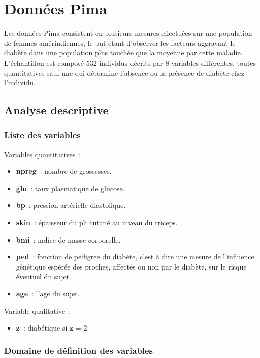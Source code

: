 \documentclass[a4paper,10pt]{report}
\begin{document}
\section{Données Pima}
\label{section:pima-descriptif}

Les données Pima consistent en plusieurs mesures effectuées sur une population de femmes amérindiennes, le but étant d'observer les facteurs aggravant le diabète dans une population plus touchée que la moyenne par cette maladie.
L'échantillon est composé 532 individus décrits par 8 variables différentes, toutes quantitatives sauf une qui détermine l'absence ou la présence de diabète chez l'individu.

\subsection{Analyse descriptive}

\subsubsection{Liste des variables}

Variables quantitatives~:
\begin{itemize}
	\item \textbf{npreg}~: nombre de grossesses.
	\item \textbf{glu}~: taux plasmatique de glucose.
	\item \textbf{bp}~: pression artérielle diastolique.
	\item \textbf{skin}~: épaisseur du pli cutané au niveau du triceps.
	\item \textbf{bmi}~: indice de masse corporelle.
	\item \textbf{ped}~: fonction de pedigree du diabète, c'est à dire une mesure de l’influence génétique espérée des proches, affectés ou non par le diabète, sur le risque éventuel du sujet.
	\item \textbf{age}~: l'age du sujet.
\end{itemize}
Variable qualitative~:
\begin{itemize}
	\item \textbf{z}~: diabétique si \textbf{z} = 2.
\end{itemize}

\subsubsection{Domaine de définition des variables}
\end{document}
